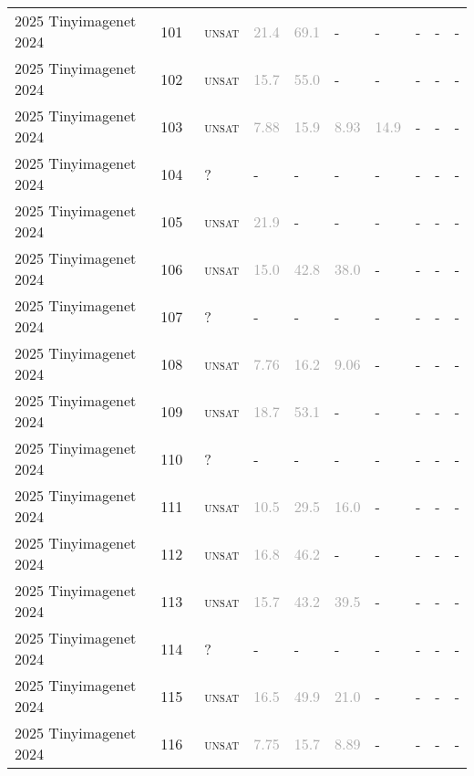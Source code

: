 \begin{center}
{\begin{longtable}{@{}llllllllll@{}}
2025 Tinyimagenet 2024 & 101 & ~\textsc{unsat} & \textcolor{darkgray}{21.4} & \textcolor{darkgray}{69.1} & - & - & - & - & - \\
2025 Tinyimagenet 2024 & 102 & ~\textsc{unsat} & \textcolor{darkgray}{15.7} & \textcolor{darkgray}{55.0} & - & - & - & - & - \\
2025 Tinyimagenet 2024 & 103 & ~\textsc{unsat} & \textcolor{darkgray}{7.88} & \textcolor{darkgray}{15.9} & \textcolor{darkgray}{8.93} & \textcolor{darkgray}{14.9} & - & - & - \\
2025 Tinyimagenet 2024 & 104 & ~? & - & - & - & - & - & - & - \\
2025 Tinyimagenet 2024 & 105 & ~\textsc{unsat} & \textcolor{darkgray}{21.9} & - & - & - & - & - & - \\
2025 Tinyimagenet 2024 & 106 & ~\textsc{unsat} & \textcolor{darkgray}{15.0} & \textcolor{darkgray}{42.8} & \textcolor{darkgray}{38.0} & - & - & - & - \\
2025 Tinyimagenet 2024 & 107 & ~? & - & - & - & - & - & - & - \\
2025 Tinyimagenet 2024 & 108 & ~\textsc{unsat} & \textcolor{darkgray}{7.76} & \textcolor{darkgray}{16.2} & \textcolor{darkgray}{9.06} & - & - & - & - \\
2025 Tinyimagenet 2024 & 109 & ~\textsc{unsat} & \textcolor{darkgray}{18.7} & \textcolor{darkgray}{53.1} & - & - & - & - & - \\
2025 Tinyimagenet 2024 & 110 & ~? & - & - & - & - & - & - & - \\
2025 Tinyimagenet 2024 & 111 & ~\textsc{unsat} & \textcolor{darkgray}{10.5} & \textcolor{darkgray}{29.5} & \textcolor{darkgray}{16.0} & - & - & - & - \\
2025 Tinyimagenet 2024 & 112 & ~\textsc{unsat} & \textcolor{darkgray}{16.8} & \textcolor{darkgray}{46.2} & - & - & - & - & - \\
2025 Tinyimagenet 2024 & 113 & ~\textsc{unsat} & \textcolor{darkgray}{15.7} & \textcolor{darkgray}{43.2} & \textcolor{darkgray}{39.5} & - & - & - & - \\
2025 Tinyimagenet 2024 & 114 & ~? & - & - & - & - & - & - & - \\
2025 Tinyimagenet 2024 & 115 & ~\textsc{unsat} & \textcolor{darkgray}{16.5} & \textcolor{darkgray}{49.9} & \textcolor{darkgray}{21.0} & - & - & - & - \\
2025 Tinyimagenet 2024 & 116 & ~\textsc{unsat} & \textcolor{darkgray}{7.75} & \textcolor{darkgray}{15.7} & \textcolor{darkgray}{8.89} & - & - & - & - \\

\end{longtable}}
\end{center}
